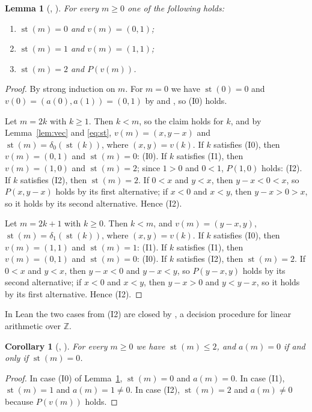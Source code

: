 \documentclass[11pt]{amsart}
\theoremstyle{plain}
\newtheorem{lemma}[theorem]{Lemma}
\newtheorem{corollary}[theorem]{Corollary}
\theoremstyle{definition}
\newcommand{\Z}{\mathbb{Z}}
\newcommand{\st}{\operatorname{st}}
\begin{document}
\begin{lemma}[, ]\label{lem:inv}
For every $m\ge0$ one of the following holds:
\begin{enumerate}
\item[(I0)] $\st(m)=0$ and $v(m)=(0,1)$;
\item[(I1)] $\st(m)=1$ and $v(m)=(1,1)$;
\item[(I2)] $\st(m)=2$ and $P(v(m))$.
\end{enumerate}
\end{lemma}

\begin{proof}
By strong induction on $m$. For $m=0$ we have $\st(0)=0$ and $v(0)=(a(0),a(1))=(0,1)$ by  and , so (I0) holds.

Let $m=2k$ with $k\ge1$. Then $k<m$, so the claim holds for $k$, and by Lemma~\ref{lem:vec} and \eqref{eq:st}, $v(m)=(x,y-x)$ and $\st(m)=\delta_0(\st(k))$, where $(x,y)=v(k)$.
If $k$ satisfies (I0), then $v(m)=(0,1)$ and $\st(m)=0$: (I0).
If $k$ satisfies (I1), then $v(m)=(1,0)$ and $\st(m)=2$; since $1>0$ and $0<1$, $P(1,0)$ holds: (I2).
If $k$ satisfies (I2), then $\st(m)=2$. If $0<x$ and $y<x$, then $y-x<0<x$, so $P(x,y-x)$ holds by its first alternative; if $x<0$ and $x<y$, then $y-x>0>x$, so it holds by its second alternative. Hence (I2).

Let $m=2k+1$ with $k\ge0$. Then $k<m$, and $v(m)=(y-x,y)$, $\st(m)=\delta_1(\st(k))$, where $(x,y)=v(k)$.
If $k$ satisfies (I0), then $v(m)=(1,1)$ and $\st(m)=1$: (I1).
If $k$ satisfies (I1), then $v(m)=(0,1)$ and $\st(m)=0$: (I0).
If $k$ satisfies (I2), then $\st(m)=2$. If $0<x$ and $y<x$, then $y-x<0$ and $y-x<y$, so $P(y-x,y)$ holds by its second alternative; if $x<0$ and $x<y$, then $y-x>0$ and $y<y-x$, so it holds by its first alternative. Hence (I2).
\end{proof}

In Lean the two cases from (I2) are closed by , a decision procedure for linear arithmetic over $\Z$.

\begin{corollary}[, ]\label{cor:zero}
For every $m\ge0$ we have $\st(m)\le2$, and $a(m)=0$ if and only if $\st(m)=0$.
\end{corollary}

\begin{proof}
In case (I0) of Lemma~\ref{lem:inv}, $\st(m)=0$ and $a(m)=0$. In case (I1), $\st(m)=1$ and $a(m)=1\ne0$. In case (I2), $\st(m)=2$ and $a(m)\ne0$ because $P(v(m))$ holds.
\end{proof}
\end{document}
